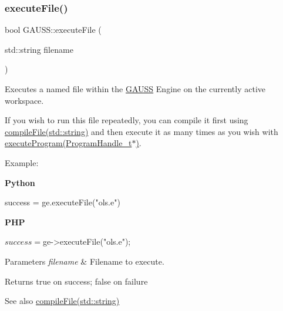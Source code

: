 \subsubsection{\texorpdfstring{execute\+File()}{executeFile()}\hspace{0.1cm}{\footnotesize\ttfamily [1/2]}}
{\footnotesize\ttfamily bool G\+A\+U\+S\+S\+::execute\+File (\begin{DoxyParamCaption}\item[{std\+::string}]{filename }\end{DoxyParamCaption})}



Executes a named file within the \hyperlink{class_g_a_u_s_s}{G\+A\+U\+SS} Engine on the currently active workspace. 

If you wish to run this file repeatedly, you can compile it first using \hyperlink{class_g_a_u_s_s_a981bdafede1af555a73b9abe05333341}{compile\+File(std\+::string)} and then execute it as many times as you wish with \hyperlink{class_g_a_u_s_s_a7fc9de69421c14aadb9a6310fecabcca}{execute\+Program(\+Program\+Handle\+\_\+t$\ast$)}.

Example\+:

{\bfseries Python} 
\begin{DoxyCode}
success = ge.executeFile(\textcolor{stringliteral}{"ols.e"})
\end{DoxyCode}


{\bfseries P\+HP} 
\begin{DoxyCode}
$success = $ge->executeFile(\textcolor{stringliteral}{"ols.e"});
\end{DoxyCode}



\begin{DoxyParams}{Parameters}
{\em filename} & Filename to execute. \\
\hline
\end{DoxyParams}
\begin{DoxyReturn}{Returns}
true on success; false on failure
\end{DoxyReturn}
\begin{DoxySeeAlso}{See also}
\hyperlink{class_g_a_u_s_s_a981bdafede1af555a73b9abe05333341}{compile\+File(std\+::string)} 
\end{DoxySeeAlso}
\mbox{\label{class_g_a_u_s_s_a7d4b858cf5909ffaf97dbf3d10bb753e}} 
